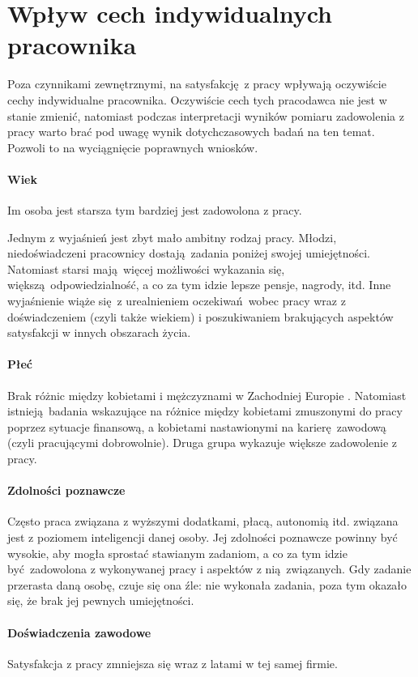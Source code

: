 \section{Wpływ cech indywidualnych pracownika}
\label{sec:theory-sat-age}
Poza czynnikami zewnętrznymi, na satysfakcję z pracy wpływają oczywiście cechy indywidualne pracownika. Oczywiście cech tych pracodawca nie jest w stanie zmienić, natomiast podczas interpretacji wyników pomiaru zadowolenia z pracy warto brać pod uwagę wynik dotychczasowych badań na ten temat. Pozwoli to na wyciągnięcie poprawnych wniosków.

\paragraph{Wiek} Im osoba jest starsza tym bardziej jest zadowolona z pracy. 

Jednym z wyjaśnień jest zbyt mało ambitny rodzaj pracy. Młodzi, niedoświadczeni pracownicy dostają zadania poniżej swojej umiejętności. Natomiast starsi mają więcej możliwości wykazania się, większą odpowiedzialność, a co za tym idzie lepsze pensje, nagrody, itd. Inne wyjaśnienie wiąże się z urealnieniem oczekiwań wobec pracy wraz z doświadczeniem (czyli
także wiekiem) i poszukiwaniem brakujących aspektów satysfakcji w innych obszarach życia.
\paragraph{Płeć} Brak różnic między kobietami i mężczyznami w Zachodniej Europie \cite{de1991gender}. Natomiast istnieją badania wskazujące na różnice między kobietami zmuszonymi do pracy poprzez sytuacje finansową, a kobietami nastawionymi na karierę zawodową (czyli pracującymi dobrowolnie). Druga grupa wykazuje większe zadowolenie z pracy.
\paragraph{Zdolności poznawcze} Często praca związana z wyższymi dodatkami, płacą, autonomią itd. związana jest z poziomem inteligencji danej osoby. Jej zdolności poznawcze powinny być wysokie, aby mogła sprostać stawianym zadaniom, a co za tym idzie być zadowolona z wykonywanej pracy i aspektów z nią związanych. Gdy zadanie przerasta daną osobę, czuje się ona źle: nie wykonała zadania, poza tym okazało się, że brak jej pewnych umiejętności.
\paragraph{Doświadczenia zawodowe} Satysfakcja z pracy zmniejsza się wraz z latami w tej samej firmie. 

